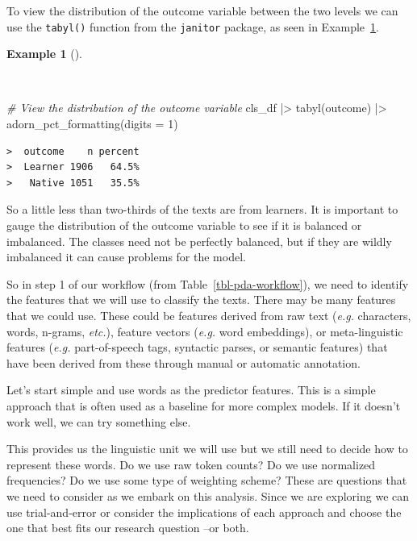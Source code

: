 \documentclass[
  letterpaper,
  DIV=11,
  numbers=noendperiod]{scrreprt}
\newenvironment{Shaded}{\begin{snugshade}}{\end{snugshade}}
\newcommand{\AttributeTok}[1]{\textcolor[rgb]{0.00,0.00,0.00}{#1}}
\newcommand{\CommentTok}[1]{\textcolor[rgb]{0.00,0.00,0.00}{\textit{#1}}}
\newcommand{\DecValTok}[1]{\textcolor[rgb]{0.00,0.00,0.00}{#1}}
\newcommand{\FunctionTok}[1]{\textcolor[rgb]{0.00,0.00,0.00}{#1}}
\newcommand{\NormalTok}[1]{\textcolor[rgb]{0.00,0.00,0.00}{#1}}
\newcommand{\SpecialCharTok}[1]{\textcolor[rgb]{0.00,0.00,0.00}{#1}}
\theoremstyle{definition}
\newtheorem{example}{Example}[chapter]
\theoremstyle{remark}
\begin{document}
To view the distribution of the outcome variable between the two levels
we can use the \texttt{tabyl()} function from the \texttt{janitor}
package, as seen in Example~\ref{exm-pda-class-data-tabyl}.

\begin{example}[]\protect\hypertarget{exm-pda-class-data-tabyl}{}\label{exm-pda-class-data-tabyl}

~

\begin{Shaded}
\begin{Highlighting}[]
\CommentTok{\# View the distribution of the outcome variable}
\NormalTok{cls\_df }\SpecialCharTok{|\textgreater{}}
  \FunctionTok{tabyl}\NormalTok{(outcome) }\SpecialCharTok{|\textgreater{}}
  \FunctionTok{adorn\_pct\_formatting}\NormalTok{(}\AttributeTok{digits =} \DecValTok{1}\NormalTok{)}
\end{Highlighting}
\end{Shaded}

\begin{verbatim}
>  outcome    n percent
>  Learner 1906   64.5%
>   Native 1051   35.5%
\end{verbatim}

\end{example}

So a little less than two-thirds of the texts are from learners. It is
important to gauge the distribution of the outcome variable to see if it
is balanced or imbalanced. The classes need not be perfectly balanced,
but if they are wildly imbalanced it can cause problems for the model.

So in step 1 of our workflow (from Table~\ref{tbl-pda-workflow}), we
need to identify the features that we will use to classify the texts.
There may be many features that we could use. These could be features
derived from raw text (\emph{e.g.} characters, words, n-grams,
\emph{etc.}), feature vectors (\emph{e.g.} word embeddings), or
meta-linguistic features (\emph{e.g.} part-of-speech tags, syntactic
parses, or semantic features) that have been derived from these through
manual or automatic annotation.

Let's start simple and use words as the predictor features. This is a
simple approach that is often used as a baseline for more complex
models. If it doesn't work well, we can try something else.

This provides us the linguistic unit we will use but we still need to
decide how to represent these words. Do we use raw token counts? Do we
use normalized frequencies? Do we use some type of weighting scheme?
These are questions that we need to consider as we embark on this
analysis. Since we are exploring we can use trial-and-error or consider
the implications of each approach and choose the one that best fits our
research question --or both.
\end{document}
